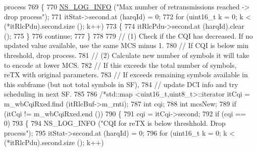 \begin{DoxyCode}
{       process}
769                                 \{
770                                         \hyperlink{group__logging_gafbd73ee2cf9f26b319f49086d8e860fb}{NS\_LOG\_INFO} (\textcolor{stringliteral}{"Max number of retransmissions reached ->
       drop process"});
771                                         itStat->second.at (harqId) = 0;
772                                         \textcolor{keywordflow}{for} (uint16\_t k = 0; k < (*itRlcPdu).second.size (); k++)
773                                         \{
774                                                 itRlcPdu->second.at (harqId).clear ();
775                                         \}
776                                         \textcolor{keywordflow}{continue};
777                                 \}
778 
779                                 \textcolor{comment}{// (1) Check if the CQI has decreased. If no updated value available, use
       the same MCS minus 1.}
780                                 \textcolor{comment}{//                      If CQI is below min threshold, drop process.}
781                                 \textcolor{comment}{// (2) Calculate new number of symbols it will take to encode at lower MCS.}
782                                 \textcolor{comment}{//                      If this exceeds the total number of symbols, reTX
       with original parameters.}
783                                 \textcolor{comment}{//                      If exceeds remaining symbols available in this
       subframe (but not total symbols in SF),}
784                                 \textcolor{comment}{//                      update DCI info and try scheduling in next SF.}
785 
786                                 \textcolor{comment}{/*std::map <uint16\_t,uint8\_t>::iterator itCqi = m\_wbCqiRxed.find
       (itRlcBuf->m\_rnti);}
787 \textcolor{comment}{                                int cqi;}
788 \textcolor{comment}{                                int mcsNew;}
789 \textcolor{comment}{                                if (itCqi != m\_wbCqiRxed.end ())}
790 \textcolor{comment}{                                \{}
791 \textcolor{comment}{                                        cqi = itCqi->second;}
792 \textcolor{comment}{                                        if (cqi == 0)}
793 \textcolor{comment}{                                        \{}
794 \textcolor{comment}{                                                NS\_LOG\_INFO ("CQI for reTX is below threshhold. Drop
       process");}
795 \textcolor{comment}{                                                itStat->second.at (harqId) = 0;}
796 \textcolor{comment}{                                                for (uint16\_t k = 0; k < (*itRlcPdu).second.size (); k++)}

\end{DoxyCode}
